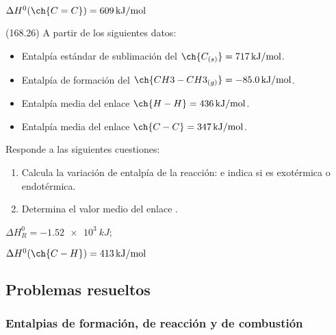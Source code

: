 \documentclass[10pt,a5paper,twoside]{article}
\begin{document}
  \begin{solution}
    \( \Delta H^0 (\ch{C=C}) = \SI{609}{kJ/mol} \)
  \end{solution}





  \begin{exercise}[
      tags    = {},
      topics  = {química, termodinámica, termoquímica},
      source  = {FQ 1B MGH 2016, p168, e26},
    ]
    (168.26) A partir de los siguientes datos:
    \begin{itemize}
      \item Entalpía estándar de sublimación del \( \ch{C_{(s)}} = \SI{717}{kJ/mol} \).
      \item Entalpía de formación del \( \ch{CH3-CH3_{(g)}} = \SI{-85,0}{kJ/mol} \).
      \item Entalpía media del enlace \( \ch{H-H} = \SI{436}{kJ/mol} \).
      \item Entalpía media del enlace \( \ch{C-C} = \SI{347}{kJ/mol} \).
    \end{itemize}
    Responde a las siguientes cuestiones: %
    \begin{enumerate}
      \item Calcula la variación de entalpía de la reacción:
       e indica si es exotérmica
      o endotérmica.
      \item Determina el valor medio del enlace .
    \end{enumerate}
  \end{exercise}

  \begin{solution}
    \begin{enumerate*}
      \item \( \Delta H^0_R = \SI{-1.52e3}{kJ} \); \item \( \Delta H^0 (\ch{C-H}) = \SI{413}{kJ/mol} \)
    \end{enumerate*}
  \end{solution}






  \subsection*{Problemas resueltos}

  \subsubsection*{Entalpias de formación, de reacción y de combustión}
\end{document}
